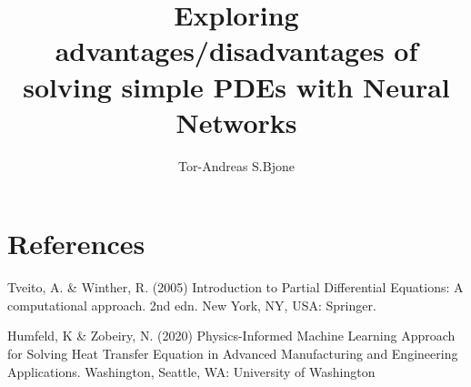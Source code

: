\documentclass[a4paper,10pt,english]{article}
\title{Exploring advantages/disadvantages of solving simple PDEs with Neural Networks}
\author{Tor-Andreas S.Bjone}
\begin{document}
\maketitle


\tableofcontents

\newpage






\section*{References}  
\begin{itemize}
 Tveito, A. \& Winther, R. (2005) Introduction to Partial Differential Equations: A computational approach. 2nd edn. New York, NY, USA: Springer.

 Humfeld, K \& Zobeiry, N. (2020)  Physics-Informed Machine Learning Approach for Solving Heat Transfer Equation
    in Advanced Manufacturing and Engineering Applications. Washington, Seattle, WA: University of Washington
\end{itemize}
\end{document}
